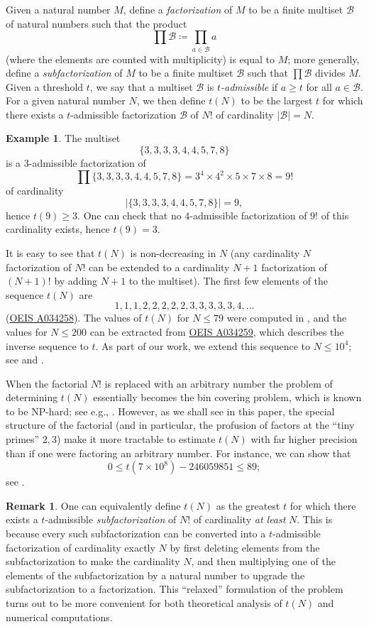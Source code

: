 \documentclass[12pt,a4paper,reqno]{amsart}
\numberwithin{equation}{section}
\theoremstyle{plain}
\theoremstyle{definition}
\newtheorem{remark}[theorem]{Remark}
\newtheorem{example}[theorem]{Example}
\newcommand\tuple{{\mathcal B}}
\begin{document}
Given a natural number $M$, define a \emph{factorization} of $M$ to be a finite multiset $\tuple$ of natural numbers such that the product
$$ \prod \tuple \coloneqq \prod_{a \in \tuple} a$$
(where the elements are counted with multiplicity) is equal to $M$; more generally, define a \emph{subfactorization} of $M$ to be a finite multiset $\tuple$ such that $\prod \tuple$ divides $M$.  Given a threshold $t$, we say that a multiset $\tuple$ is \emph{$t$-admissible} if $a \geq t$ for all $a \in \tuple$.  For a given natural number $N$, we then define $t(N)$ to be the largest $t$ for which there exists a $t$-admissible factorization $\tuple$ of $N!$ of cardinality $|\tuple|=N$.  

\begin{example}\label{nine}  The multiset
  $$ \{ 3,3,3,3,4,4,5,7,8\}$$
  is a $3$-admissible factorization of 
$$ \prod \{ 3,3,3,3,4,4,5,7,8\} = 3^4 \times 4^2 \times 5 \times 7 \times 8 = 9!$$
of cardinality 
$$|\{ 3,3,3,3,4,4,5,7,8\}| = 9,$$
 hence $t(9) \geq 3$.  One can check that no $4$-admissible factorization of $9!$ of this cardinality exists, hence $t(9) = 3$.
\end{example}

It is easy to see that $t(N)$ is non-decreasing in $N$ (any cardinality $N$ factorization of $N!$ can be extended to a cardinality $N+1$ factorization of $(N+1)!$ by adding $N+1$ to the multiset).  The first few elements of the sequence $t(N)$ are
$$ 1,1,1,2,2,2,2,2,3,3,3,3,3,4, \dots$$
(\href{https://oeis.org/A034258}{OEIS A034258}). The values of $t(N)$ for $N \leq 79$ were computed in \cite{guy}, and the values for $N \leq 200$ can be extracted from \href{https://oeis.org/A034259}{OEIS A034259}, which describes the inverse sequence to $t$.  As part of our work, we extend this sequence to $N \leq 10^4$; see \cite{github} and .

When the factorial $N!$ is replaced with an arbitrary number the problem of determining $t(N)$ essentially becomes the bin covering problem, which is known to be NP-hard; see e.g., \cite{bincover}.  However, as we shall see in this paper, the special structure of the factorial (and in particular, the profusion of factors at the ``tiny primes'' $2,3$) make it more tractable to estimate $t(N)$ with far higher precision than if one were factoring an arbitrary number.  For instance, we can show that
$$ 0 \leq t(7 \times 10^8) - \num{246059851} \leq 89;$$
see .

\begin{remark}\label{subfac}  One can equivalently define $t(N)$ as the greatest $t$ for which there exists a $t$-admissible \emph{subfactorization} of $N!$ of cardinality \emph{at least} $N$.  This is because every such subfactorization can be converted into a $t$-admissible factorization of cardinality exactly $N$ by first deleting elements from the subfactorization to make the cardinality $N$, and then multiplying one of the elements of the subfactorization by a natural number to upgrade the subfactorization to a factorization.  This ``relaxed'' formulation of the problem turns out to be more convenient for both theoretical analysis of $t(N)$ and numerical computations.
\end{remark}
\end{document}
